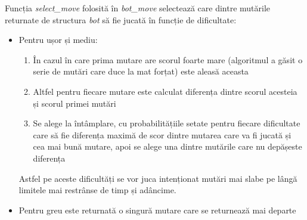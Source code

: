 Funcția \textit{select\_move} folosită în \textit{bot\_move} selectează care dintre mutările
returnate de structura \textit{bot} să fie jucată în funcție de dificultate:
\begin{itemize}
	\item Pentru ușor și mediu:
	      \begin{enumerate}
		      \item În cazul în care prima mutare are scorul foarte mare (algoritmul a găsit
		            o serie de mutări care duce la mat forțat) este aleasă aceasta
		      \item Altfel pentru fiecare mutare este calculat diferența dintre scorul acesteia și
		            scorul primei mutări
		      \item Se alege la întâmplare, cu probabilitățiile setate pentru fiecare dificultate
		            care să fie diferența maximă de scor dintre mutarea care va fi jucată și cea mai
		            bună mutare, apoi se alege una dintre mutările care nu depășeste diferența
	      \end{enumerate}
	      Astfel pe aceste dificultăți se vor juca intenționat mutări mai slabe pe lângă limitele
	      mai restrânse de timp și adâncime.

	\item Pentru greu este returnată o singură mutare care se returnează mai departe
\end{itemize}

